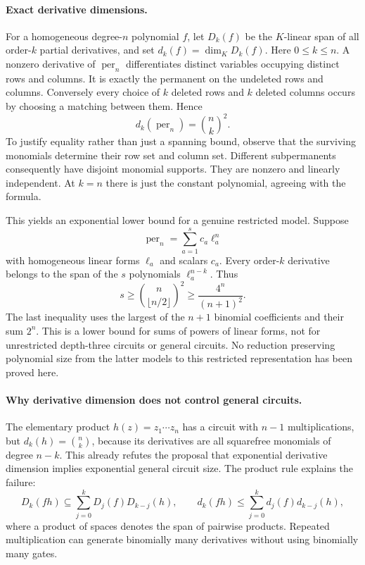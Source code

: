 \documentclass[11pt]{article}
\begin{document}
\paragraph{Exact derivative dimensions.}
For a homogeneous degree-$n$ polynomial $f$, let $D_k(f)$ be the
$K$-linear span of all order-$k$ partial derivatives, and set
$d_k(f)=\dim_K D_k(f)$. Here $0\le k\le n$.
A nonzero derivative of $\operatorname{per}_n$ differentiates distinct
variables occupying distinct rows and columns. It is exactly the
permanent on the undeleted rows and columns. Conversely every choice
of $k$ deleted rows and $k$ deleted columns occurs by choosing a
matching between them. Hence
\begin{equation}\label{vp:derivatives}
 d_k(\operatorname{per}_n)=\binom nk^2.
\end{equation}
To justify equality rather than just a spanning bound, observe that
the surviving monomials determine their row set and column set.
Different subpermanents consequently have disjoint monomial supports.
They are nonzero and linearly independent. At $k=n$ there is just the
constant polynomial, agreeing with the formula.

This yields an exponential lower bound for a genuine restricted model.
Suppose
\[
 \operatorname{per}_n=\sum_{a=1}^s c_a\ell_a^n
\]
with homogeneous linear forms $\ell_a$ and scalars $c_a$. Every
order-$k$ derivative belongs to the span of the $s$ polynomials
$\ell_a^{n-k}$. Thus
\[
 s\ge\binom n{\lfloor n/2\rfloor}^{\!2}
       \ge\frac{4^n}{(n+1)^2}.
\]
The last inequality uses the largest of the $n+1$ binomial
coefficients and their sum $2^n$. This is a lower bound for sums of
powers of linear forms, not for unrestricted depth-three circuits or
general circuits. No reduction preserving polynomial size from the
latter models to this restricted representation has been proved here.

\paragraph{Why derivative dimension does not control general circuits.}
The elementary product $h(z)=z_1\cdots z_n$ has a circuit with $n-1$
multiplications, but $d_k(h)=\binom nk$, because its derivatives are
all squarefree monomials of degree $n-k$. This already refutes the
proposal that exponential derivative dimension implies exponential
general circuit size. The product rule explains the failure:
\[
 D_k(fh)\subseteq\sum_{j=0}^k D_j(f)D_{k-j}(h),\qquad
 d_k(fh)\le\sum_{j=0}^k d_j(f)d_{k-j}(h),
\]
where a product of spaces denotes the span of pairwise products.
Repeated multiplication can generate binomially many derivatives
without using binomially many gates.
\end{document}
